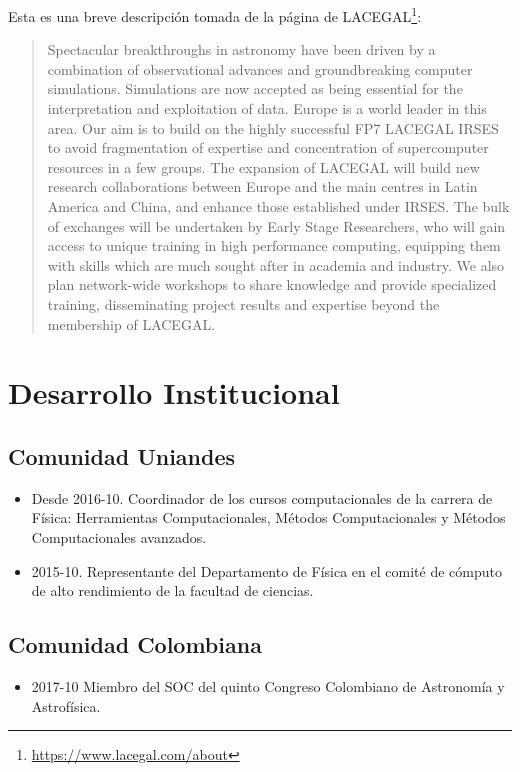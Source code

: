 \documentclass{article}
\begin{document}
\begin{itemize}
Esta es una breve descripci\'on tomada de la p\'agina de LACEGAL\footnote{\url{https://www.lacegal.com/about}}:
\begin{quote}
Spectacular breakthroughs in astronomy have been driven by a combination of observational advances and groundbreaking computer simulations. Simulations are now accepted as being essential for the interpretation and exploitation of data. Europe is a world leader in this area. Our aim is to build on the highly successful FP7 LACEGAL IRSES to avoid fragmentation of expertise and concentration of supercomputer resources in a few groups. The expansion of LACEGAL will build new research collaborations between Europe and the main centres in Latin America and China, and enhance those established under IRSES. The bulk of exchanges will be undertaken by Early Stage Researchers, who will gain access to unique training in high performance computing, equipping them with skills which are much sought after in academia and industry. We also plan network-wide workshops to share knowledge and provide specialized training, disseminating project results and expertise beyond the membership of LACEGAL.
\end{quote}
\end{itemize}



\newpage
\section{Desarrollo Institucional}


\subsection{Comunidad Uniandes}
\begin{itemize}
\item {Desde 2016-10. Coordinador de los cursos computacionales de la carrera de
  F\'isica: Herramientas Computacionales, M\'etodos Computacionales y
  M\'etodos Computacionales avanzados.} 
\item {2015-10. Representante del Departamento de F\'isica en el comit\'e
  de c\'omputo de alto rendimiento de la facultad de ciencias.}
\end{itemize}


\subsection{Comunidad Colombiana}

\begin{itemize}
\item {2017-10} Miembro del SOC del quinto Congreso Colombiano de Astronom\'ia y
  Astrof\'isica.
\end{itemize}
\end{document}
